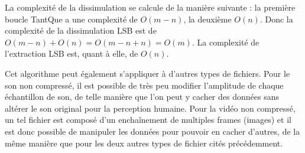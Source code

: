 \documentclass[11pt]{article}
\begin{document}






La complexité de la dissimulation se calcule de la manière suivante : 
la première boucle TantQue a une complexité de $O(m-n)$, la deuxième $O(n)$. 
\newline Donc la complexité de la dissimulation LSB est de $O(m-n)+O(n)=O(m-n+n)=O(m)$. 
\newline La complexité de l'extraction LSB est, quant à elle, de $O(n)$.

Cet algorithme peut également s'appliquer à d'autres types de fichiers. Pour le
son non compressé, il est possible de très peu modifier l'amplitude de chaque
échantillon de son, de telle manière que l'on peut y cacher des données sans
altérer le son original pour la perception humaine. Pour la vidéo non compressé,
un tel fichier est composé d'un enchaînement de multiples frames (images) et il
est donc possible de manipuler les données pour pouvoir en cacher d'autres, de
la même manière que pour les deux autres types de fichier cités précédemment.

\end{document}
